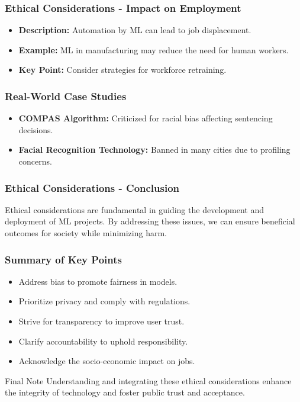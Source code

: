 \documentclass[aspectratio=169]{beamer}
\begin{document}
\begin{frame}[fragile]
    \frametitle{Ethical Considerations - Impact on Employment}
    \begin{itemize}
        \item \textbf{Description:} Automation by ML can lead to job displacement.
        \item \textbf{Example:} ML in manufacturing may reduce the need for human workers.
        \item \textbf{Key Point:} Consider strategies for workforce retraining.
    \end{itemize}
\end{frame}

\begin{frame}[fragile]
    \frametitle{Real-World Case Studies}
    \begin{itemize}
        \item \textbf{COMPAS Algorithm:} Criticized for racial bias affecting sentencing decisions.
        \item \textbf{Facial Recognition Technology:} Banned in many cities due to profiling concerns.
    \end{itemize}
\end{frame}

\begin{frame}[fragile]
    \frametitle{Ethical Considerations - Conclusion}
    Ethical considerations are fundamental in guiding the development and deployment of ML projects. By addressing these issues, we can ensure beneficial outcomes for society while minimizing harm.
\end{frame}

\begin{frame}[fragile]
    \frametitle{Summary of Key Points}
    \begin{itemize}
        \item Address bias to promote fairness in models.
        \item Prioritize privacy and comply with regulations.
        \item Strive for transparency to improve user trust.
        \item Clarify accountability to uphold responsibility.
        \item Acknowledge the socio-economic impact on jobs.
    \end{itemize}
    
    \begin{block}{Final Note}
        Understanding and integrating these ethical considerations enhance the integrity of technology and foster public trust and acceptance.
    \end{block}
\end{frame}
\end{document}
